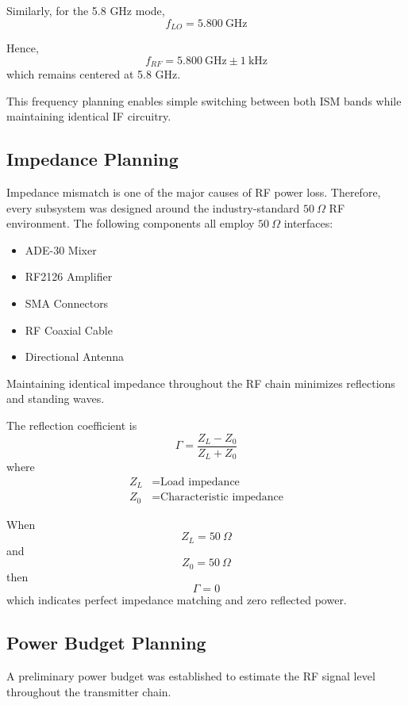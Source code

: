 \documentclass[12pt,a4paper]{report}
\begin{document}
	Similarly, for the 5.8 GHz mode,
	\begin{equation}
		f_{LO} = 5.800\ \text{GHz}
	\end{equation}
	
	Hence,
	\begin{equation}
		f_{RF} = 5.800\ \text{GHz} \pm 1\ \text{kHz}
	\end{equation}
	which remains centered at 5.8 GHz.
	
	This frequency planning enables simple switching between both ISM bands while maintaining identical IF circuitry.
	
	
	\subsection{Impedance Planning}
	Impedance mismatch is one of the major causes of RF power loss. Therefore, every subsystem was designed around the industry-standard $50\ \Omega$ RF environment. The following components all employ $50\ \Omega$ interfaces:
	\begin{itemize}
		\item ADE-30 Mixer
		\item RF2126 Amplifier
		\item SMA Connectors
		\item RF Coaxial Cable
		\item Directional Antenna
	\end{itemize}
	Maintaining identical impedance throughout the RF chain minimizes reflections and standing waves.
	
	The reflection coefficient is
	\begin{equation}
		\Gamma = \frac{Z_L - Z_0}{Z_L + Z_0}
	\end{equation}
	where
	\begin{align*}
		Z_L &= \text{Load impedance} \\
		Z_0 &= \text{Characteristic impedance}
	\end{align*}
	
	When
	\begin{equation}
		Z_L = 50\ \Omega
	\end{equation}
	and
	\begin{equation}
		Z_0 = 50\ \Omega
	\end{equation}
	then
	\begin{equation}
		\Gamma = 0
	\end{equation}
	which indicates perfect impedance matching and zero reflected power.
	
	\subsection{Power Budget Planning}
	A preliminary power budget was established to estimate the RF signal level throughout the transmitter chain.
	
\end{document}
